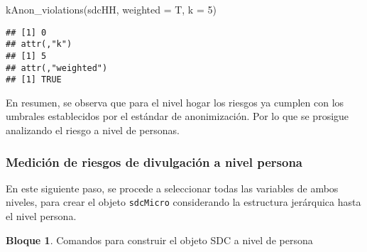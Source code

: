 \documentclass[
]{book}
\newenvironment{Shaded}{\begin{snugshade}}{\end{snugshade}}
\newcommand{\AttributeTok}[1]{\textcolor[rgb]{0.77,0.63,0.00}{#1}}
\newcommand{\DecValTok}[1]{\textcolor[rgb]{0.00,0.00,0.81}{#1}}
\newcommand{\FunctionTok}[1]{\textcolor[rgb]{0.00,0.00,0.00}{#1}}
\newcommand{\NormalTok}[1]{#1}
\theoremstyle{definition}
\theoremstyle{definition}
\newtheorem{example}{Bloque}[chapter]
\theoremstyle{definition}
\theoremstyle{definition}
\theoremstyle{remark}
\begin{document}
\begin{Shaded}
\begin{Highlighting}[]
\FunctionTok{kAnon\_violations}\NormalTok{(sdcHH, }\AttributeTok{weighted =}\NormalTok{ T, }\AttributeTok{k =} \DecValTok{5}\NormalTok{)}
\end{Highlighting}
\end{Shaded}

\begin{verbatim}
## [1] 0
## attr(,"k")
## [1] 5
## attr(,"weighted")
## [1] TRUE
\end{verbatim}

En resumen, se observa que para el nivel hogar los riesgos ya cumplen con los umbrales establecidos por el estándar de anonimización. Por lo que se prosigue analizando el riesgo a nivel de personas.

\hypertarget{mediciuxf3n-de-riesgos-de-divulgaciuxf3n-a-nivel-persona}{%
\subsubsection{Medición de riesgos de divulgación a nivel persona}\label{mediciuxf3n-de-riesgos-de-divulgaciuxf3n-a-nivel-persona}}

En este siguiente paso, se procede a seleccionar todas las variables de ambos niveles, para crear el objeto \texttt{sdcMicro} considerando la estructura jerárquica hasta el nivel persona.

\begin{example}
\protect\hypertarget{exm:bloque48nbm}{}\label{exm:bloque48nbm}Comandos para construir el objeto SDC a nivel de persona
\end{example}
\end{document}
